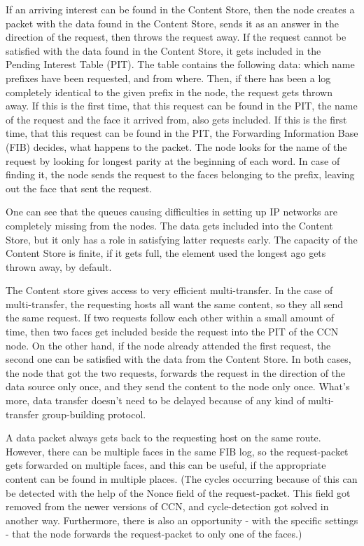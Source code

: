 \documentclass[a4paper]{article}
\begin{document}
If an arriving interest can be found in the Content Store, then the node creates a packet with the
data found in the Content Store, sends it as an answer in the direction of the request, then throws
the request away. If the request cannot be satisfied with the data found in the Content Store, it 
gets included in the Pending Interest Table (PIT). The table contains the following data: which name
prefixes have been requested, and from where. Then, if there has been a log completely identical to
the given prefix in the node, the request gets thrown away. If this is the first time, that this 
request can be found in the PIT, the name of the request and the face it arrived from, also gets
included. If this is the first time, that this request can be found in the PIT, the Forwarding 
Information Base (FIB) decides, what happens to the packet. The node looks for the name of the 
request by looking for longest parity at the beginning of each word. In case of finding it, the node
sends the request to the faces belonging to the prefix, leaving out the face that sent the request.

One can see that the queues causing difficulties in setting up IP networks are completely 
missing from the nodes. The data gets included into the Content Store, but it only has a role in 
satisfying latter requests early. The capacity of the Content Store is finite, if it gets full, the
element used the longest ago gets thrown away, by default.

The Content store gives access to very efficient multi-transfer. In the case of multi-transfer,
the requesting hosts all want the same content, so they all send the same request. If two requests
follow each other within a small amount of time, then two faces get included beside the request into
the PIT of the CCN node. On the other hand, if the node already attended the first request, the 
second one can be satisfied with the data from the Content Store. In both cases, the node that got 
the two requests, forwards the request in the direction of the data source only once, and they send
the content to the node only once. What's more, data transfer doesn't need to be delayed because of
any kind of multi-transfer group-building protocol. 

A data packet always gets back to the requesting host on the same route. However, there can be 
multiple faces in the same FIB log, so the request-packet gets forwarded on multiple faces, and this
can be useful, if the appropriate content can be found in multiple places. (The cycles occurring
because of this can be detected with the help of the Nonce field of the request-packet. This field
got removed from the newer versions of CCN, and cycle-detection got solved in another way.
Furthermore, there is also an opportunity - with the specific settings - that the node forwards the
request-packet to only one of the faces.)
\end{document}
